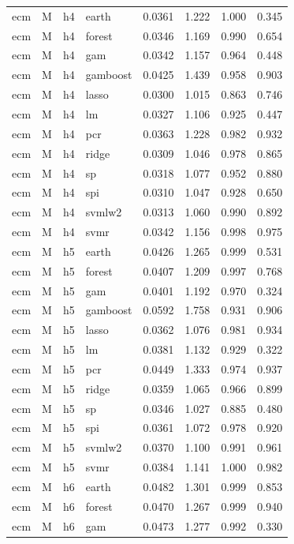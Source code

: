\begin{ThreePartTable}
\begin{longtable}[t]{llclcccc}
\addlinespace
ecm & M & h4 & earth & 0.0361 & 1.222 & 1.000 & 0.345\\
ecm & M & h4 & forest & 0.0346 & 1.169 & 0.990 & 0.654\\
ecm & M & h4 & gam & 0.0342 & 1.157 & 0.964 & 0.448\\
ecm & M & h4 & gamboost & 0.0425 & 1.439 & 0.958 & 0.903\\
ecm & M & h4 & lasso & 0.0300 & 1.015 & 0.863 & 0.746\\
ecm & M & h4 & lm & 0.0327 & 1.106 & 0.925 & 0.447\\
ecm & M & h4 & pcr & 0.0363 & 1.228 & 0.982 & 0.932\\
ecm & M & h4 & ridge & 0.0309 & 1.046 & 0.978 & 0.865\\
ecm & M & h4 & sp & 0.0318 & 1.077 & 0.952 & 0.880\\
ecm & M & h4 & spi & 0.0310 & 1.047 & 0.928 & 0.650\\
ecm & M & h4 & svmlw2 & 0.0313 & 1.060 & 0.990 & 0.892\\
ecm & M & h4 & svmr & 0.0342 & 1.156 & 0.998 & 0.975\\
\addlinespace
ecm & M & h5 & earth & 0.0426 & 1.265 & 0.999 & 0.531\\
ecm & M & h5 & forest & 0.0407 & 1.209 & 0.997 & 0.768\\
ecm & M & h5 & gam & 0.0401 & 1.192 & 0.970 & 0.324\\
ecm & M & h5 & gamboost & 0.0592 & 1.758 & 0.931 & 0.906\\
ecm & M & h5 & lasso & 0.0362 & 1.076 & 0.981 & 0.934\\
ecm & M & h5 & lm & 0.0381 & 1.132 & 0.929 & 0.322\\
ecm & M & h5 & pcr & 0.0449 & 1.333 & 0.974 & 0.937\\
ecm & M & h5 & ridge & 0.0359 & 1.065 & 0.966 & 0.899\\
ecm & M & h5 & sp & 0.0346 & 1.027 & 0.885 & 0.480\\
ecm & M & h5 & spi & 0.0361 & 1.072 & 0.978 & 0.920\\
ecm & M & h5 & svmlw2 & 0.0370 & 1.100 & 0.991 & 0.961\\
ecm & M & h5 & svmr & 0.0384 & 1.141 & 1.000 & 0.982\\
\addlinespace
ecm & M & h6 & earth & 0.0482 & 1.301 & 0.999 & 0.853\\
ecm & M & h6 & forest & 0.0470 & 1.267 & 0.999 & 0.940\\
ecm & M & h6 & gam & 0.0473 & 1.277 & 0.992 & 0.330\\

\end{longtable}
\end{ThreePartTable}
